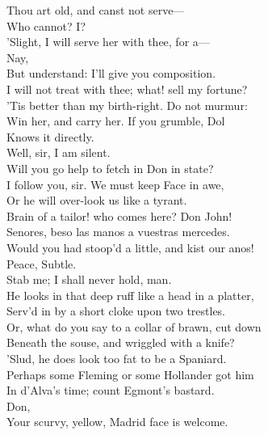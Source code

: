 \documentclass[a4paper,oneside]{memoir}
\begin{document}
\begin{drama*}
Thou art old, and canst not serve---\\
\subtlespeaks {} Who cannot? I?\\
'Slight, I will serve her with thee, for a---\\
\facespeaks {} Nay,\\
But understand: I'll give you composition.\\
\subtlespeaks I will not treat with thee; what! sell my fortune?\\
'Tis better than my birth-right. Do not murmur:\\
Win her, and carry her. If you grumble, Dol\\
Knows it directly.\\
\facespeaks {} Well, sir, I am silent.\\
Will you go help to fetch in Don in state?\\
\subtlespeaks I follow you, sir. We must keep Face in awe,\\
Or he will over-look us like a tyrant.\\
Brain of a tailor! who comes here? Don John!\\
\surlyspeaks Senores, beso las manos a vuestras mercedes.\\
\subtlespeaks Would you had stoop'd a little, and kist our anos!\\
\facespeaks Peace, Subtle.\\
\subtlespeaks {} Stab me; I shall never hold, man.\\
He looks in that deep ruff like a head in a platter,\\
Serv'd in by a short cloke upon two trestles.\\
\facespeaks Or, what do you say to a collar of brawn, cut down\\
Beneath the souse, and wriggled with a knife?\\
\subtlespeaks 'Slud, he does look too fat to be a Spaniard.\\
\facespeaks Perhaps some Fleming or some Hollander got him\\
In d'Alva's time; count Egmont's bastard.\\
\subtlespeaks {} Don,\\
Your scurvy, yellow, Madrid face is welcome.\\

\end{drama*}
\end{document}
